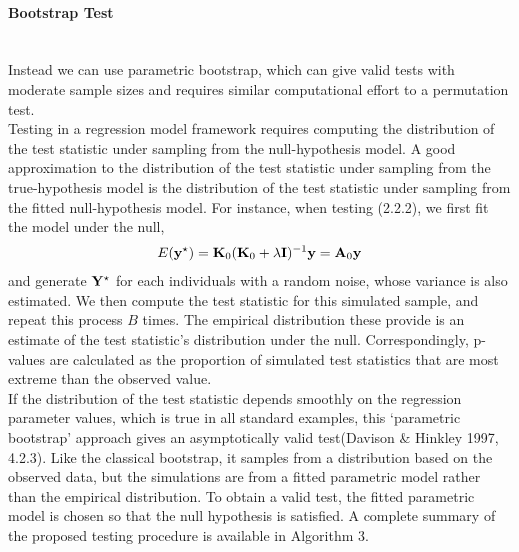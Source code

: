 \documentclass[11pt]{article}
\begin{document}
\paragraph{Bootstrap Test}\mbox{}\\
Instead we can use parametric bootstrap, which can give valid tests with moderate sample sizes and requires similar computational effort to a permutation test.\\
Testing in a regression model framework requires computing the distribution of the test statistic under sampling from the null-hypothesis model. A good approximation to the distribution of the test statistic under sampling from the true-hypothesis model is the distribution of the test statistic under sampling from the fitted null-hypothesis model. For instance, when testing (2.2.2), we first fit the model under the null,
\begin{align}
E({\bf y}^\star)={\bf K}_0({\bf K}_0+\lambda {\bf I})^{-1}{\bf y}={\bf A}_0{\bf y}
\end{align}
and generate ${\bf Y}^\star$ for each individuals with a random noise, whose variance is also estimated. We then compute the test statistic for this simulated sample, and repeat this process $B$ times. The empirical distribution these provide is an estimate of the test statistic's distribution under the null. Correspondingly, p-values are calculated as the proportion of simulated test statistics that are most extreme than the observed value.\\
If the distribution of the test statistic depends smoothly on the regression parameter values, which is true in all standard examples, this ‘parametric bootstrap’ approach gives an asymptotically valid test(Davison \& Hinkley 1997, 4.2.3). Like the classical bootstrap, it samples from a distribution based on the observed data, but the simulations are from a fitted parametric model rather than the empirical distribution. To obtain a valid test, the fitted parametric model is chosen so that the null hypothesis is satisfied.
A complete summary of the proposed testing procedure is available in Algorithm 3.\\
\end{document}
